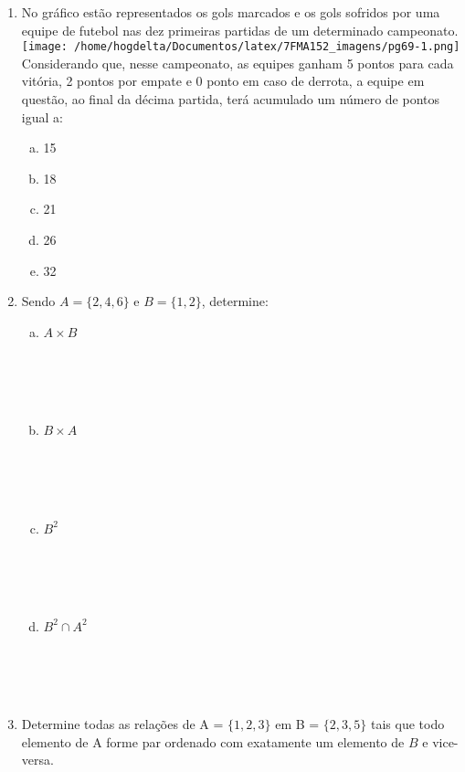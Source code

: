 \documentclass[a4paper,14pt]{article}
\begin{document}
\begin{multicols}{2}
\begin{enumerate}
    	    \item No gráfico estão representados os gols marcados e os gols sofridos por uma equipe de futebol nas dez primeiras partidas de um determinado campeonato.
    	    \texttt{[image: /home/hogdelta/Documentos/latex/7FMA152\_imagens/pg69-1.png]}
    	    Considerando que, nesse campeonato, as equipes ganham 5 pontos para cada vitória, 2 pontos por empate e 0 ponto em caso de derrota, a equipe em questão, ao final da décima partida, terá acumulado um número de pontos igual a:\\
    	    \begin{enumerate}[a)]
    	    	\item 15
    	    	\item 18
    	    	\item 21
    	    	\item 26
    	    	\item 32
    	    \end{enumerate}
	        \item Sendo $A = \{2, 4, 6\}$ e $B = \{1, 2\}$, determine:
	        \begin{enumerate}[a)]
		    	\item $A \times B$ \\\\\\\\\\
		    	\item $B \times A$ \\\\\\\\\\
		    	\item $B^2$ \\\\\\\\\\
		    	\item $B^2 \cap A^2$ \\\\\\\\\\
	        \end{enumerate}
            \item Determine todas as relações de A = $\{1, 2, 3\}$ em B = $\{2, 3, 5\}$ tais que todo elemento de A forme par ordenado com exatamente um elemento de $B$ e vice-versa.
            \\\\\\\\\\\\\\\\\\\\

\end{enumerate}
\end{multicols}
\end{document}
